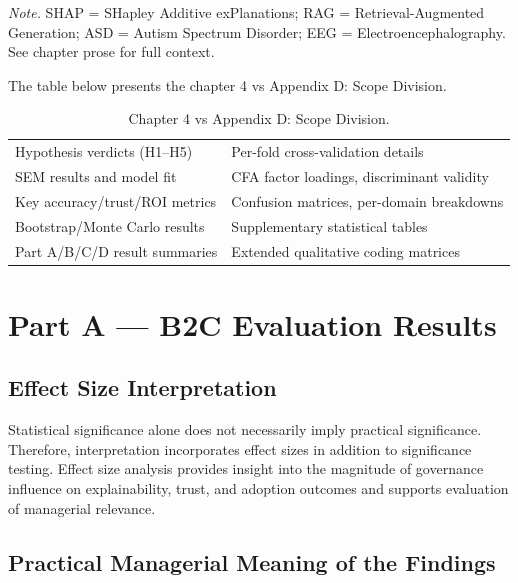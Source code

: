 \vspace{0.3em}\noindent\textit{Note.} SHAP = SHapley Additive exPlanations; RAG = Retrieval-Augmented Generation; ASD = Autism Spectrum Disorder; EEG = Electroencephalography. See chapter prose for full context.

\noindent The table below presents the chapter 4 vs Appendix D: Scope Division.

\begin{table}[!htbp]
\centering
\caption{Chapter 4 vs Appendix D: Scope Division.}
\tablestripes\tablefontsize
\begin{tabularx}{\textwidth}{@{} L L @{}}
\toprule
{} &  \\
\midrule
Hypothesis verdicts (H1--H5) & Per-fold cross-validation details \\
\addlinespace
SEM results and model fit & CFA factor loadings, discriminant validity \\
\addlinespace
Key accuracy/trust/ROI metrics & Confusion matrices, per-domain breakdowns \\
\addlinespace
Bootstrap/Monte Carlo results & Supplementary statistical tables \\
\addlinespace
Part A/B/C/D result summaries & Extended qualitative coding matrices \\
\bottomrule
\end{tabularx}
\end{table}

\section{Part A --- B2C Evaluation Results}

\subsection{Effect Size Interpretation}
\label{sec:effect_size_interpretation}

\noindent Statistical significance alone does not necessarily imply practical significance. Therefore, interpretation incorporates effect sizes in addition to significance testing. Effect size analysis provides insight into the magnitude of governance influence on explainability, trust, and adoption outcomes and supports evaluation of managerial relevance.


\subsection{Practical Managerial Meaning of the Findings}
\label{sec:practical_managerial_meaning}

